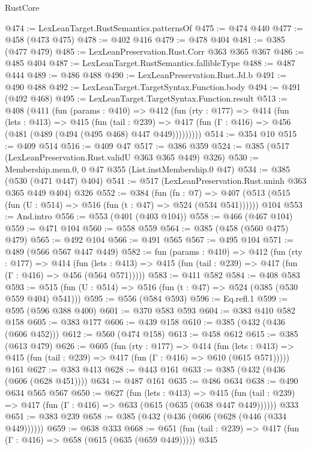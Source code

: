 \begin{lexlean}{RustCore}
\begin{coremodule}
@474 := LexLeanTarget.RustSemantics.patternsOf
@475 := @474 @440
@477 := @458 (@473 @475)
@478 := @402 @416
@479 := @478 @404
@481 := @385 (@477 @479)
@485 := LexLeanPreservation.Rust.Corr @363 @365 @367
@486 := @485 @404
@487 := LexLeanTarget.RustSemantics.fallibleType
@488 := @487 @444
@489 := @486 @488
@490 := LexLeanPreservation.Rust.Jd.b
@491 := @490 @488
@492 := LexLeanTarget.TargetSyntax.Function.body
@494 := @491 (@492 @468)
@495 := LexLeanTarget.TargetSyntax.Function.result
@513 := @408
    (@411
      (fun (params : @410) =>
      @412
        (fun (rty : @177) =>
        @414
          (fun (lets : @413) =>
          @415
            (fun (tail : @239) =>
            @417 (fun (Γ : @416) => @456 (@481 (@489 (@494 (@495 @468) @447 @449)))))))))
@514 := @354 @10
@515 := @409 @514
@516 := @409 @47
@517 := @386 @359
@524 := @385 (@517 (LexLeanPreservation.Rust.validU @363 @365 @449) @326)
@530 := Membership.mem.{0, 0} @47 @355 (List.instMembership.{0} @47)
@534 := @385 (@530 (@471 @447) @404)
@541 := @517 (LexLeanPreservation.Rust.uninh @363 @365 @449 @404) @326
@552 := @384
    (fun (fn : @7) =>
    @407 (@513 (@515 (fun (U : @514) => @516 (fun (t : @47) => @524 (@534 @541))))))
    @104
@553 := And.intro
@556 := @553 (@401 (@403 @104))
@558 := @466 (@467 @104)
@559 := @471 @104
@560 := @558 @559
@564 := @385 (@458 (@560 @475) @479)
@565 := @492 @104
@566 := @491 @565
@567 := @495 @104
@571 := @489 (@566 @567 @447 @449)
@582 := fun (params : @410) =>
  @412
    (fun (rty : @177) =>
    @414
      (fun (lets : @413) => @415 (fun (tail : @239) => @417 (fun (Γ : @416) => @456 (@564 @571)))))
@583 := @411 @582
@584 := @408 @583
@593 := @515 (fun (U : @514) => @516 (fun (t : @47) => @524 (@385 (@530 @559 @404) @541)))
@595 := @556 (@584 @593)
@596 := Eq.refl.{1}
@599 := @595 (@596 @388 @400)
@601 := @370 @583 @593
@604 := @383 @410 @582 @158
@605 := @383 @177
@606 := @439 @158
@610 := @385 (@432 (@436 (@606 @452)))
@612 := @560 (@474 @158)
@613 := @458 @612
@615 := @385 (@613 @479)
@626 := @605
    (fun (rty : @177) =>
    @414
      (fun (lets : @413) => @415 (fun (tail : @239) => @417 (fun (Γ : @416) => @610 (@615 @571)))))
    @161
@627 := @383 @413
@628 := @443 @161
@633 := @385 (@432 (@436 (@606 (@628 @451))))
@634 := @487 @161
@635 := @486 @634
@638 := @490 @634 @565 @567
@650 := @627
    (fun (lets : @413) =>
    @415 (fun (tail : @239) => @417 (fun (Γ : @416) => @633 (@615 (@635 (@638 @447 @449))))))
    @333
@651 := @383 @239
@658 := @385 (@432 (@436 (@606 (@628 (@446 (@334 @449))))))
@659 := @638 @333
@668 := @651 (fun (tail : @239) => @417 (fun (Γ : @416) => @658 (@615 (@635 (@659 @449))))) @345

\end{coremodule}
\end{lexlean}
